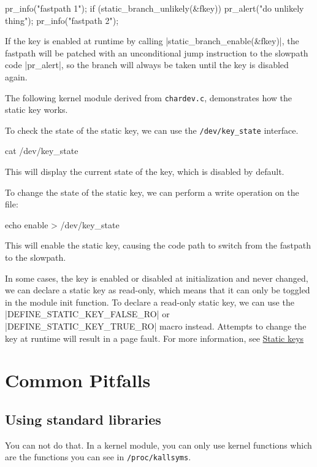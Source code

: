 \documentclass[10pt, oneside]{book}
\begin{document}
\begin{code}
pr_info("fastpath 1\n");
if (static_branch_unlikely(&fkey))
    pr_alert("do unlikely thing\n");
pr_info("fastpath 2\n");
\end{code}

If the key is enabled at runtime by calling \cpp|static_branch_enable(&fkey)|, the fastpath will be patched with an unconditional jump instruction to the slowpath code \cpp|pr_alert|, so the branch will always be taken until the key is disabled again.

The following kernel module derived from \verb|chardev.c|, demonstrates how the static key works.


To check the state of the static key, we can use the \verb|/dev/key_state| interface.

\begin{codebash}
cat /dev/key_state
\end{codebash}

This will display the current state of the key, which is disabled by default.

To change the state of the static key, we can perform a write operation on the file:

\begin{codebash}
echo enable > /dev/key_state
\end{codebash}

This will enable the static key, causing the code path to switch from the fastpath to the slowpath.

In some cases, the key is enabled or disabled at initialization and never changed, we can declare a static key as read-only, which means that it can only be toggled in the module init function. To declare a read-only static key, we can use the \cpp|DEFINE_STATIC_KEY_FALSE_RO| or \cpp|DEFINE_STATIC_KEY_TRUE_RO| macro instead. Attempts to change the key at runtime will result in a page fault.
For more information, see \href{https://www.kernel.org/doc/Documentation/static-keys.txt}{Static keys}

\section{Common Pitfalls}
\label{sec:pitfall}

\subsection{Using standard libraries}
\label{sec:using_stdlib}
You can not do that.
In a kernel module, you can only use kernel functions which are the functions you can see in \verb|/proc/kallsyms|.
\end{document}
